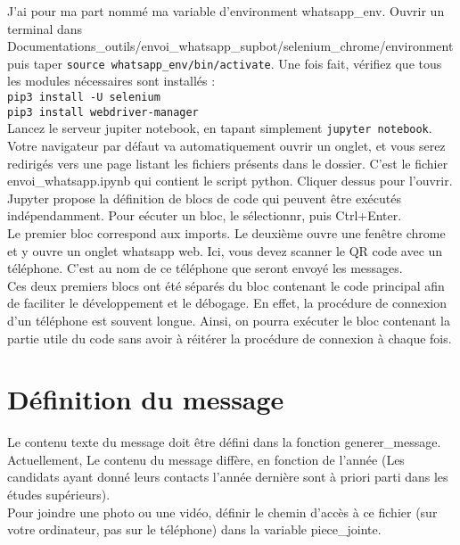 \documentclass[10pt]{article}
\begin{document}
J'ai pour ma part nommé ma variable d'environment whatsapp\_env. Ouvrir un terminal dans Documentations\_outils/envoi\_whatsapp\_supbot/selenium\_chrome/environment puis taper \texttt{source whatsapp\_env/bin/activate}. Une fois fait, vérifiez que tous les modules nécessaires sont installés : \\
\texttt{pip3 install -U selenium} \\
\texttt{pip3 install webdriver-manager}\\ 
Lancez le serveur jupiter notebook, en tapant simplement \texttt{jupyter notebook}.\\

Votre navigateur par défaut va automatiquement ouvrir un onglet, et vous serez redirigés vers une page listant les fichiers présents dans le dossier. C'est le fichier envoi\_whatsapp.ipynb qui contient le script python. Cliquer dessus pour l'ouvrir.\\

Jupyter propose la définition de blocs de code qui peuvent être exécutés indépendamment. Pour eécuter un bloc, le sélectionnr, puis Ctrl+Enter. \\
Le premier bloc correspond aux imports. Le deuxième ouvre une fenêtre chrome et y ouvre un onglet whatsapp web. Ici, vous devez scanner le QR code avec un téléphone. C'est au nom de ce téléphone que seront envoyé les messages.\\
Ces deux premiers blocs ont été séparés du bloc contenant le code principal afin de faciliter le développement et le débogage. En effet, la procédure de connexion d'un téléphone est souvent longue. Ainsi, on pourra exécuter le bloc contenant la partie utile du code sans avoir à réitérer la procédure de connexion à chaque fois.\\


\section{Définition du message}
Le contenu texte du message doit être défini dans la fonction generer\_message. Actuellement, Le contenu du message diffère, en fonction de l'année (Les candidats ayant donné leurs contacts l'année dernière sont à priori parti dans les études supérieurs).\\

Pour joindre une photo ou une vidéo, définir le chemin d'accès à ce fichier (sur votre ordinateur, pas sur le téléphone) dans la variable piece\_jointe.
\end{document}
